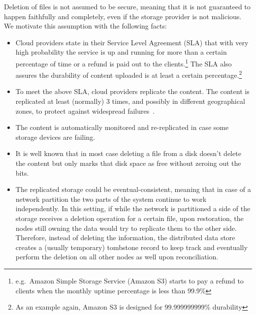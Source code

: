 Deletion of files is not assumed to be secure, meaning that it is not guaranteed to happen faithfully and completely,
even if the storage provider is not malicious.
We motivate this assumption with the following facts:
\begin{itemize}
    \item Cloud providers state in their Service Level Agreement (SLA) that
    with very high probability the service is up and running for more than a certain percentage of time or a refund is paid out to the clients.\footnote{e.g.\ Amazon Simple Storage Service (Amazon S3) starts to pay a refund to clients when the monthly uptime percentage is less than 99.9\%}
    The SLA also assures the durability of content uploaded is at least a certain percentage.\footnote{As an example again, Amazon S3 is designed for 99.999999999\% durability}
    \item To meet the above SLA, cloud providers replicate the content. The content is replicated at least (normally) 3 times, and possibly in different geographical zones, to protect against widespread failures~\cite{AzureBlobStorage}.
    \item The content is automatically monitored and re-replicated in case some storage devices are failing.
    \item It is well known that in most case deleting a file from a disk doesn't delete the content but only marks that disk space as free without zeroing out the bits.
    \item The replicated storage could be eventual-consistent, 
    meaning that in case of a network partition the two 
    parts of the system continue to work independently. 
    In this setting, if while the network is partitioned 
    a side of the storage receives a deletion operation 
    for a certain file, upon restoration,
    the nodes still owning the data would try to replicate 
    them to the other side.
    Therefore, instead of deleting the information, 
    the distributed data store creates a (usually temporary) 
    tombstone record to keep track and eventually perform 
    the deletion on all other nodes as well upon reconciliation.
\end{itemize}


